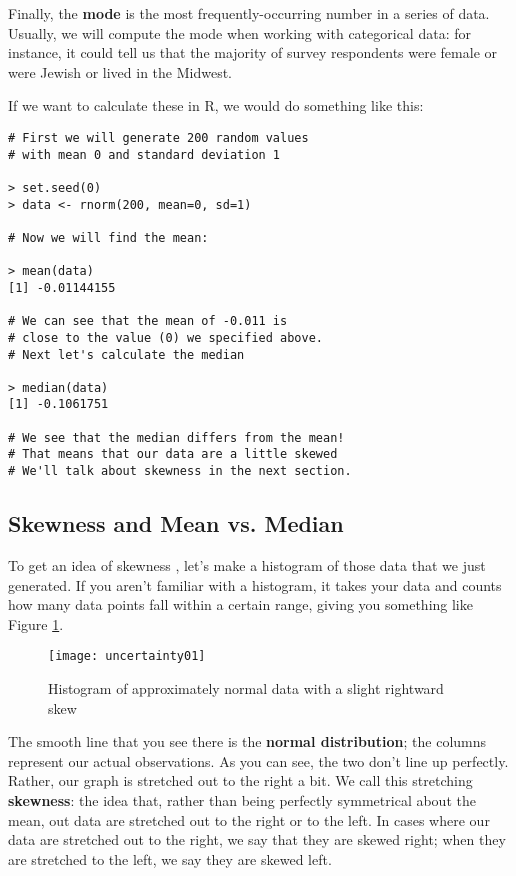 Finally, the \textbf{mode}  is the most frequently-occurring number in a series of data. Usually, we will compute the mode when working with categorical data: for instance, it could tell us that the majority of survey respondents were female or were Jewish or lived in the Midwest.

If we want to calculate these in R, we would do something like this:

\begin{framed}
\begin{Verbatim}[samepage=TRUE]
# First we will generate 200 random values
# with mean 0 and standard deviation 1
 
> set.seed(0)
> data <- rnorm(200, mean=0, sd=1)
 
# Now we will find the mean:
 
> mean(data)
[1] -0.01144155
 
# We can see that the mean of -0.011 is
# close to the value (0) we specified above.
# Next let's calculate the median
 
> median(data)
[1] -0.1061751
 
# We see that the median differs from the mean!
# That means that our data are a little skewed
# We'll talk about skewness in the next section.
\end{Verbatim}
\end{framed}

\subsection{Skewness and Mean vs. Median}
To get an idea of skewness , let's make a histogram of those data that we just generated. If you aren't familiar with a histogram, it takes your data and counts how many data points fall within a certain range, giving you something like Figure \ref{fig:uncertainty01}.

\begin{figure}[h!]
\texttt{[image: uncertainty01]}
\caption{Histogram of approximately normal data with a slight rightward skew}
\label{fig:uncertainty01}
\end{figure}

The smooth line that you see there is the \textbf{normal distribution}; the columns represent our actual observations. As you can see, the two don't line up perfectly. Rather, our graph is stretched out to the right a bit. We call this stretching \textbf{skewness}: the idea that, rather than being perfectly symmetrical about the mean, out data are stretched out to the right or to the left. In cases where our data are stretched out to the right, we say that they are skewed right; when they are stretched to the left, we say they are skewed left.

